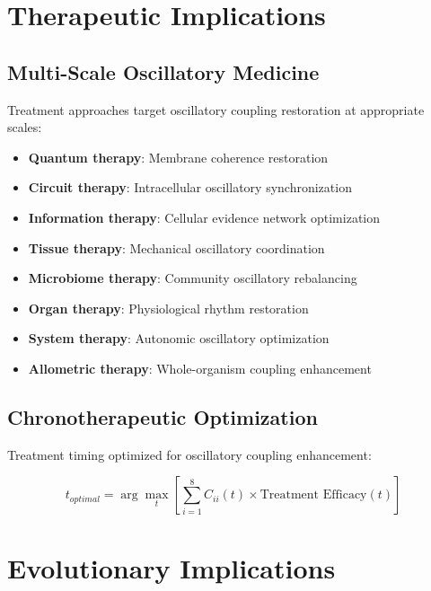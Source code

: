 \documentclass[twocolumn]{article}
\begin{document}
\section{Therapeutic Implications}

\subsection{Multi-Scale Oscillatory Medicine}

Treatment approaches target oscillatory coupling restoration at appropriate scales:

\begin{definition}
\begin{itemize}
\item \textbf{Quantum therapy}: Membrane coherence restoration
\item \textbf{Circuit therapy}: Intracellular oscillatory synchronization
\item \textbf{Information therapy}: Cellular evidence network optimization
\item \textbf{Tissue therapy}: Mechanical oscillatory coordination
\item \textbf{Microbiome therapy}: Community oscillatory rebalancing
\item \textbf{Organ therapy}: Physiological rhythm restoration
\item \textbf{System therapy}: Autonomic oscillatory optimization
\item \textbf{Allometric therapy}: Whole-organism coupling enhancement
\end{itemize}
\end{definition}

\subsection{Chronotherapeutic Optimization}

Treatment timing optimized for oscillatory coupling enhancement:

\begin{equation}
t_{optimal} = \arg\max_t \left[\sum_{i=1}^{8} C_{ii}(t) \times \text{Treatment Efficacy}(t)\right]
\end{equation}

\section{Evolutionary Implications}
\end{document}
